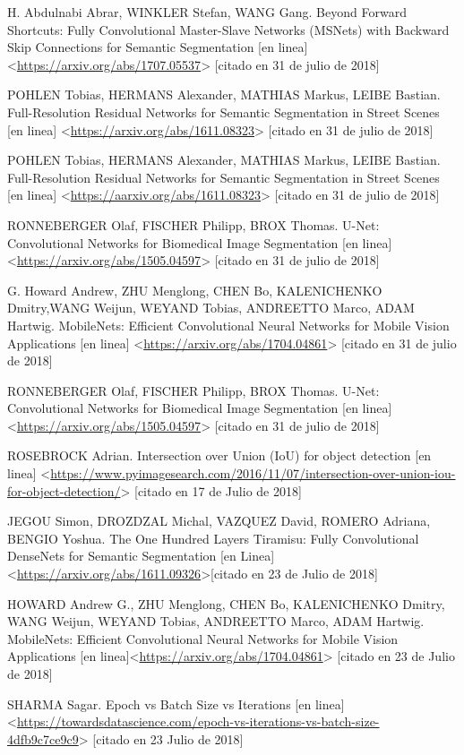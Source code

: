 H. Abdulnabi Abrar, WINKLER Stefan, WANG Gang. Beyond Forward Shortcuts: Fully Convolutional Master-Slave Networks (MSNets) with Backward Skip Connections for Semantic Segmentation [en linea] <\url{https://arxiv.org/abs/1707.05537}> [citado en 31 de julio de 2018]

POHLEN Tobias, HERMANS Alexander, MATHIAS Markus, LEIBE Bastian. Full-Resolution Residual Networks for Semantic Segmentation in Street Scenes [en linea] <\url{https://arxiv.org/abs/1611.08323}> [citado en 31 de julio de 2018]

POHLEN Tobias, HERMANS Alexander, MATHIAS Markus, LEIBE Bastian. Full-Resolution Residual Networks for Semantic Segmentation in Street Scenes [en linea] <\url{https://aarxiv.org/abs/1611.08323}> [citado en 31 de julio de 2018]

RONNEBERGER Olaf, FISCHER Philipp, BROX Thomas. U-Net: Convolutional Networks for Biomedical Image Segmentation [en linea] <\url{https://arxiv.org/abs/1505.04597}> [citado en 31 de julio de 2018]

G. Howard Andrew, ZHU Menglong, CHEN Bo, KALENICHENKO Dmitry,WANG Weijun, WEYAND Tobias, ANDREETTO Marco, ADAM Hartwig. MobileNets: Efficient Convolutional Neural Networks for Mobile Vision Applications [en linea] <\url{https://arxiv.org/abs/1704.04861}> [citado en 31 de julio de 2018]

RONNEBERGER Olaf, FISCHER Philipp, BROX Thomas. U-Net: Convolutional Networks for Biomedical Image Segmentation [en linea] <\url{https://arxiv.org/abs/1505.04597}> [citado en 31 de julio de 2018]

ROSEBROCK Adrian. Intersection over Union (IoU) for object detection [en linea] <\url{https://www.pyimagesearch.com/2016/11/07/intersection-over-union-iou-for-object-detection/}> [citado en 17 de Julio de 2018]

JEGOU Simon, DROZDZAL Michal, VAZQUEZ David, ROMERO Adriana, BENGIO Yoshua. The One Hundred Layers Tiramisu: Fully Convolutional DenseNets for Semantic Segmentation [en Linea]<\url{https://arxiv.org/abs/1611.09326}>[citado en 23 de Julio de 2018]

HOWARD Andrew G., ZHU Menglong, CHEN Bo, KALENICHENKO Dmitry, WANG Weijun, WEYAND Tobias, ANDREETTO Marco, ADAM Hartwig. MobileNets: Efficient Convolutional Neural Networks for Mobile Vision Applications [en linea]<\url{https://arxiv.org/abs/1704.04861}> [citado en 23 de Julio de 2018]

SHARMA Sagar. Epoch vs Batch Size vs Iterations [en linea] <\url{https://towardsdatascience.com/epoch-vs-iterations-vs-batch-size-4dfb9c7ce9c9}> [citado en 23 Julio de 2018]


